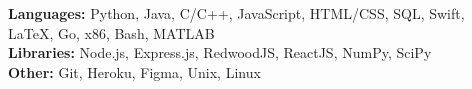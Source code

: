 \textbf{Languages:} Python, Java, C/C++, JavaScript, HTML/CSS, SQL, Swift, LaTeX, Go, x86, Bash, MATLAB \\
\textbf{Libraries:} Node.js, Express.js, RedwoodJS, ReactJS, NumPy, SciPy \\
\textbf{Other:} Git, Heroku, Figma, Unix, Linux
